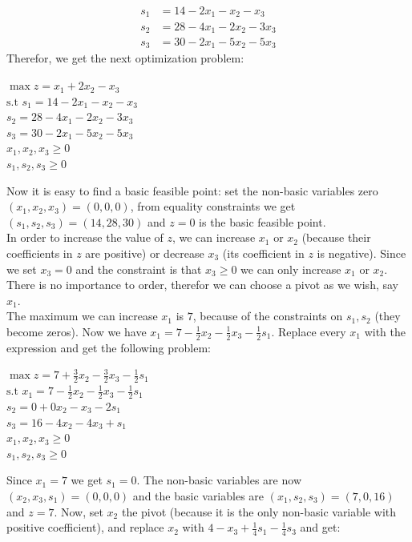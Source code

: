 \documentclass{article}
\begin{document}
\begin{align*}
    s_1 &= 14 -2x_1 -x_2 -x_3\\
    s_2 &= 28 -4x_1 -2x_2 -3x_3 \\
    s_3 &= 30 -2x_1 -5x_2 -5x_3
\end{align*}
Therefor, we get the next optimization problem:
\begin{center}
    $\max z= x_1 + 2x_2 -x_3$\\
    $\text{s.t } s_1 = 14 -2x_1 -x_2 -x_3$\\
    $s_2 = 28 -4x_1 -2x_2 -3x_3$\\
    $s_3 = 30 -2x_1 -5x_2 -5x_3$\\
    $x_1, x_2 , x_3 \ge 0$\\
    $s_1, s_2, s_3 \ge 0$
\end{center}
Now it is easy to find a basic feasible point: set the non-basic variables zero $(x_1, x_2, x_3) = (0, 0, 0)$, from equality constraints we get $(s_1, s_2, s_3) = (14, 28, 30)$ and 
$z=0$ is the basic feasible point.\\
In order to increase the value of $z$, we can increase $x_1$ or 
$x_2$ (because their coefficients in $z$ are positive) or decrease $x_3$ (its coefficient in $z$ is negative). Since we set $x_3=0$ and the constraint is that $x_3\ge 0$ we can only increase $x_1$ or $x_2$. There is no importance to order, therefor we can choose a pivot as we wish, say $x_1$.\\
The maximum we can increase $x_1$ is $7$, because of the constraints on $s_1, s_2$ (they become zeros). Now we have $x_1 = 7 -\frac{1}{2}x_2 -\frac{1}{2}x_3 -\frac{1}{2}s_1$. Replace every $x_1$ with the expression and get the following problem:
\begin{center}
    $\max z= 7+\frac{3}{2}x_2 -\frac{3}{2}x_3 -\frac{1}{2}s_1$\\
    $\text{s.t } x_1 = 7 -\frac{1}{2}x_2 -\frac{1}{2}x_3 -\frac{1}{2}s_1$\\
    $s_2 = 0+ 0x_2 -x_3 -2s_1$\\
    $s_3 = 16 -4x_2 -4x_3 +s_1$\\
    $x_1, x_2, x_3 \ge 0$\\
    $s_1, s_2 , s_3 \ge 0$
\end{center} 
Since $x_1 =7 $ we get $s_1 =0$. The non-basic variables are now $(x_2, x_3, s_1) = (0, 0, 0)$ and the basic variables are $(x_1, s_2 , s_3) = (7, 0, 16)$ and $z = 7$. Now, set $x_2$ the pivot (because it is the only non-basic variable with positive coefficient), and replace $x_2$ with $4 - x_3 +\frac{1}{4}s_1 -\frac{1}{4}s_3$ and get:
\end{document}
